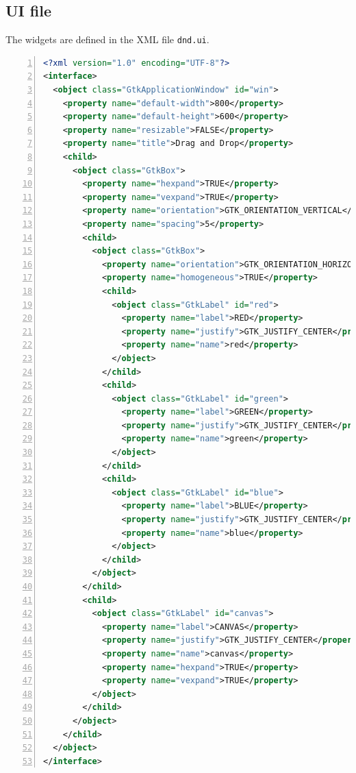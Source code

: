 \subsection{UI file}\label{ui-file}

The widgets are defined in the XML file
\passthrough{\lstinline!dnd.ui!}.

\begin{lstlisting}[language=XML, numbers=left]
<?xml version="1.0" encoding="UTF-8"?>
<interface>
  <object class="GtkApplicationWindow" id="win">
    <property name="default-width">800</property>
    <property name="default-height">600</property>
    <property name="resizable">FALSE</property>
    <property name="title">Drag and Drop</property>
    <child>
      <object class="GtkBox">
        <property name="hexpand">TRUE</property>
        <property name="vexpand">TRUE</property>
        <property name="orientation">GTK_ORIENTATION_VERTICAL</property>
        <property name="spacing">5</property>
        <child>
          <object class="GtkBox">
            <property name="orientation">GTK_ORIENTATION_HORIZONTAL</property>
            <property name="homogeneous">TRUE</property>
            <child>
              <object class="GtkLabel" id="red">
                <property name="label">RED</property>
                <property name="justify">GTK_JUSTIFY_CENTER</property>
                <property name="name">red</property>
              </object>
            </child>
            <child>
              <object class="GtkLabel" id="green">
                <property name="label">GREEN</property>
                <property name="justify">GTK_JUSTIFY_CENTER</property>
                <property name="name">green</property>
              </object>
            </child>
            <child>
              <object class="GtkLabel" id="blue">
                <property name="label">BLUE</property>
                <property name="justify">GTK_JUSTIFY_CENTER</property>
                <property name="name">blue</property>
              </object>
            </child>
          </object>
        </child>
        <child>
          <object class="GtkLabel" id="canvas">
            <property name="label">CANVAS</property>
            <property name="justify">GTK_JUSTIFY_CENTER</property>
            <property name="name">canvas</property>
            <property name="hexpand">TRUE</property>
            <property name="vexpand">TRUE</property>
          </object>
        </child>
      </object>
    </child>
  </object>
</interface>
\end{lstlisting}


